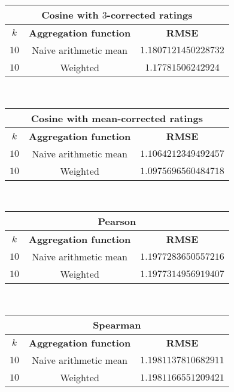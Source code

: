 \documentclass[final]{cvpr}
\begin{document}
\hspace{2em}

\begin{tabular}{| c | c | c |}
    \hline
    \multicolumn{3}{|c|}{\textbf{Cosine with $3$-corrected ratings}}\\
    \hline
		$k$ & \textbf{Aggregation function} & \textbf{RMSE}\\
    \hline
    $10$ & Naive arithmetic mean & $1.1807121450228732$\\
    \hline
    $10$ & Weighted & $1.17781506242924$\\
    \hline
\end{tabular}\\

\hspace{2em}

\begin{tabular}{| c | c | c |}
    \hline
    \multicolumn{3}{|c|}{\textbf{Cosine with mean-corrected ratings}}\\
    \hline
		$k$ & \textbf{Aggregation function} & \textbf{RMSE}\\
    \hline
    $10$ & Naive arithmetic mean & $1.1064212349492457$\\
    \hline
    $10$ & Weighted & $1.0975696560484718$\\
    \hline
\end{tabular}\\

\hspace{2em}

\begin{tabular}{| c | c | c |}
    \hline
    \multicolumn{3}{|c|}{\textbf{Pearson}}\\
    \hline
		$k$ & \textbf{Aggregation function} & \textbf{RMSE}\\
    \hline
    $10$ & Naive arithmetic mean & $1.1977283650557216$\\
    \hline
    $10$ & Weighted & $1.1977314956919407$\\
    \hline
\end{tabular}\\

\hspace{2em}

\begin{tabular}{| c | c | c |}
    \hline
    \multicolumn{3}{|c|}{\textbf{Spearman}}\\
    \hline
		$k$ & \textbf{Aggregation function} & \textbf{RMSE}\\
    \hline
    $10$ & Naive arithmetic mean & $1.1981137810682911$\\
    \hline
    $10$ & Weighted & $1.1981166551209421$\\
    \hline
\end{tabular}
\end{document}
